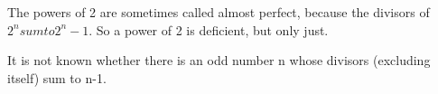 The powers of 2 are sometimes called almost perfect, because 
the divisors of $2^{n} sum to 2^{n}-1.$  So a 
power of 2 is deficient, but only just.
\par
It is not known whether there is an odd number n whose
divisors (excluding itself) sum to n-1.